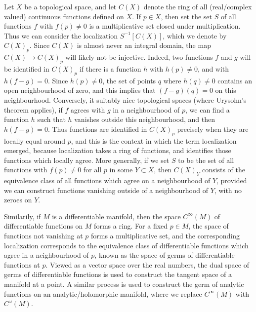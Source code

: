 \begin{example}
    Let $X$ be a topological space, and let $C(X)$ denote the ring of all (real/complex valued) continuous functions defined on $X$. If $p \in X$, then set the set $S$ of all functions $f$ with $f(p) \neq 0$ is a multiplicative set closed under multiplication. Thus we can consider the localization $S^{-1}[C(X)]$, which we denote by $C(X)_p$. Since $C(X)$ is almost never an integral domain, the map $C(X) \to C(X)_p$ will likely not be injective. Indeed, two functions $f$ and $g$ will be identified in $C(X)_p$ if there is a function $h$ with $h(p) \neq 0$, and with $h(f-g) = 0$. Since $h(p) \neq 0$, the set of points $q$ where $h(q) \neq 0$ contains an open neighbourhood of zero, and this implies that $(f - g)(q) = 0$ on this neighbourhood. Conversely, it suitably nice topological spaces (where Urysohn's theorem applies), if $f$ agrees with $g$ in a neighbourhood of $p$, we can find a function $h$ such that $h$ vanishes outside this neighbourhood, and then $h(f - g) = 0$. Thus functions are identified in $C(X)_p$ precisely when they are locally equal around $p$, and this is the context in which the term localization emerged, because localization takes a ring of functions, and identifies those functions which locally agree. More generally, if we set $S$ to be the set of all functions with $f(p) \neq 0$ for all $p$ in some $Y \subset X$, then $C(X)_Y$ consists of the equivalence class of all functions which agree on a neighbourhood of $Y$, provided we can construct functions vanishing outside of a neighbourhood of $Y$, with no zeroes on $Y$.
\end{example}

\begin{example}
    Similarily, if $M$ is a differentiable manifold, then the space $C^\infty(M)$ of differentiable functions on $M$ forms a ring. For a fixed $p \in M$, the space of functions not vanishing at $p$ forms a multiplicative set, and the corresponding localization corresponds to the equivalence class of differentiable functions which agree in a neighbourhood of $p$, known as the space of germs of differentiable functions at $p$. Viewed as a vector space over the real numbers, the dual space of germs of differentiable functions is used to construct the tangent space of a manifold at a point. A similar process is used to construct the germ of analytic functions on an analytic/holomorphic manifold, where we replace $C^\infty(M)$ with $C^\omega(M)$.
\end{example}

